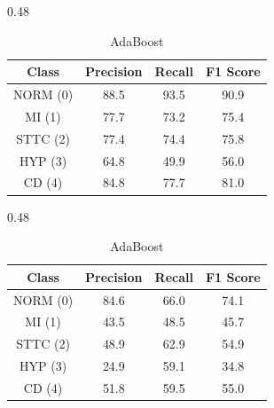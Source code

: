 \begin{table}[H]
    \begin{subtable}[t]{0.48\textwidth}
        \centering
        \caption{Histogram–based Gradient Boosting}
        \label{tab:cv_gb_part2_ablation}
        \begin{tabular}{cccc}
            \toprule
            Class & Precision & Recall & F1 Score \\
            \midrule
            NORM (0) & 88.5 & 93.5 & 90.9 \\
            MI   (1) & 77.7 & 73.2 & 75.4 \\
            STTC (2) & 77.4 & 74.4 & 75.8 \\
            HYP  (3) & 64.8 & 49.9 & 56.0 \\
            CD   (4) & 84.8 & 77.7 & 81.0 \\
            \bottomrule
        \end{tabular}
    \end{subtable}
    \hfill
    \begin{subtable}[t]{0.48\textwidth}
        \centering
        \caption{AdaBoost}
        \label{tab:cv_ada_part2_ablation}
        \begin{tabular}{cccc}
            \toprule
            Class & Precision & Recall & F1 Score \\
            \midrule
            NORM (0) & 84.6 & 66.0 & 74.1 \\
            MI   (1) & 43.5 & 48.5 & 45.7 \\
            STTC (2) & 48.9 & 62.9 & 54.9 \\
            HYP  (3) & 24.9 & 59.1 & 34.8 \\
            CD   (4) & 51.8 & 59.5 & 55.0 \\
            \bottomrule
        \end{tabular}
    \end{subtable}

    \bigskip


\end{table}
